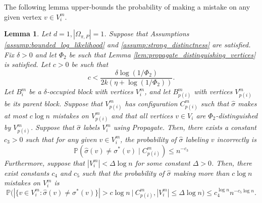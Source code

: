 \documentclass{article}
\renewcommand{\P}{\mathbb{P}}
\newcommand{\1}{\mathbbm{1}}
\theoremstyle{definition}
\theoremstyle{plain}
\newtheorem{lemma}{Lemma}
\begin{document}
The following lemma upper-bounds the probability of making a mistake on any given vertex $v \in V_i^m$.
\begin{lemma}
    Let $d = 1, |\Omega_{\pi, P}| = 1$. Suppose that Assumptions \ref{assump:bounded_log_likelihood} and \ref{assump:strong_distinctness} are satisfied. Fix $\delta > 0$ and let $\Phi_2$ be such that Lemma \ref{lem:propagate_distinguishing_vertices} is satisfied.    Let $c > 0$ be such that 
    \begin{equation}
    \label{eq:choice_c_propagate_1d}
        c < \frac{\delta \log(1 / \Phi_2)}{2k(\eta+\log(1/\Phi_2))}.
    \end{equation}  
    Let $B_i^m$ be a $\delta$-occupied block with vertices $V_i^m$, and let $B_{p(i)}^m$ with vertices $V_{p(i)}^m$ be its parent block. Suppose that $V_{p(i)}^m$ has configuration $C_{p(i)}^m$ such that $\hat{\sigma}$ makes at most $c \log n$ mistakes on $V_{p(i)}^m$ and that all vertices $v \in V_i$ are $\Phi_2$-distinguished by $V_{p(i)}^m$. Suppose that $\hat{\sigma}$ labels $V_i^m$ using Propagate. Then, there exists a constant $c_3 > 0$ such that for any given $v \in V_i^m$, the probability of $\hat{\sigma}$ labeling $v$ incorrectly is
    \begin{equation}
    \label{eq:propagate_1d_single_vertex_bound}
        \P(\hat{\sigma}(v) \neq \sigma^*(v) \mid C_{p(i)}^m) \leq n^{-c_3}
    \end{equation}
    Furthermore, suppose that $|V_i^m| < \Delta \log n$ for some constant $\Delta > 0$. Then, there exist constants $c_4$ and $c_5$ such that the probability of $\hat{\sigma}$ making more than $c \log n$ mistakes on $V_i^m$ is
    \begin{equation}
    \label{eq:propagate_1d_block_bound}
        \P\bigg( | \{v \in V_i^m: \hat{\sigma}(v) \neq \sigma^*(v)\} | > c \log n \: \Big| \: C_{p(i)}^m, |V_i^m| \leq \Delta \log n \bigg) \leq c_4^{\log n} n^{-c_5 \log n}.
    \end{equation}
\end{lemma}
\end{document}
